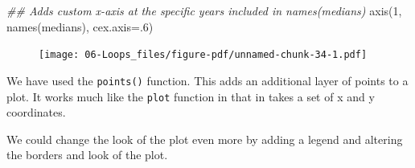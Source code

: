 \documentclass[
  letterpaper,
  DIV=11,
  numbers=noendperiod]{scrreprt}
\newenvironment{Shaded}{\begin{snugshade}}{\end{snugshade}}
\newcommand{\AttributeTok}[1]{\textcolor[rgb]{0.40,0.45,0.13}{#1}}
\newcommand{\DecValTok}[1]{\textcolor[rgb]{0.68,0.00,0.00}{#1}}
\newcommand{\DocumentationTok}[1]{\textcolor[rgb]{0.37,0.37,0.37}{\textit{#1}}}
\newcommand{\FunctionTok}[1]{\textcolor[rgb]{0.28,0.35,0.67}{#1}}
\newcommand{\NormalTok}[1]{\textcolor[rgb]{0.00,0.23,0.31}{#1}}
\begin{document}
\begin{Shaded}
\begin{Highlighting}[]
\DocumentationTok{\#\# Adds custom x{-}axis at the specific years included in names(medians)}
\FunctionTok{axis}\NormalTok{(}\DecValTok{1}\NormalTok{, }\FunctionTok{names}\NormalTok{(medians), }\AttributeTok{cex.axis=}\NormalTok{.}\DecValTok{6}\NormalTok{)}
\end{Highlighting}
\end{Shaded}

\begin{figure}[H]

{\centering \texttt{[image: 06-Loops\_files/figure-pdf/unnamed-chunk-34-1.pdf]}

}

\end{figure}

We have used the \texttt{points()} function. This adds an additional
layer of points to a plot. It works much like the \texttt{plot} function
in that in takes a set of x and y coordinates.

We could change the look of the plot even more by adding a legend and
altering the borders and look of the plot.
\end{document}
